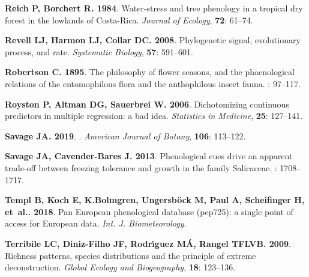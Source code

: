 \documentclass[11pt]{article}
\begin{document}
\begin{thebibliography}{39}
{  
  {\bf Reich P, Borchert R}{\bf . {1984}}.
  \newblock Water-stress and tree phenology in a tropical dry forest in the
  lowlands of Costa-Rica.
  \newblock \emph{{Journal of Ecology}}, {\bf {72}}: {61--74}.
  
  {\bf Revell LJ, Harmon LJ, Collar DC}{\bf . 2008}.
  \newblock Phylogenetic signal, evolutionary process, and rate.
  \newblock \emph{Systematic Biology}, {\bf 57}: 591--601.
  
  {\bf Robertson C}{\bf . 1895}.
  \newblock The philosophy of flower seasons, and the phaenological relations of
  the entomophilous flora and the anthophilous insect fauna.
  : 97--117.
  
  {\bf Royston P, Altman DG, Sauerbrei W}{\bf . 2006}.
  \newblock Dichotomizing continuous predictors in multiple regression: a bad
  idea.
  \newblock \emph{Statistics in Medicine}, {\bf 25}: 127--141.
  
  {\bf Savage JA}{\bf . {2019}}.
  .
  \newblock \emph{{American Journal of Botany}}, {\bf {106}}: {113--122}.
  
  {\bf Savage JA, Cavender-Bares J}{\bf . 2013}.
  \newblock Phenological cues drive an apparent trade-off between freezing
  tolerance and growth in the family Salicaceae.
  : 1708--1717.
  
  {\bf Templ B, Koch E, K.Bolmgren, Ungersb{\"o}ck M, Paul A, Scheifinger H,
  et~al.}{\bf . 2018}.
  \newblock Pan European phenological database (pep725): a single point of access
  for European data.
  \newblock \emph{Int. J. Biometeorology}.
  
  {\bf Terribile LC, Diniz-Filho JF, Rodr{\'\i}guez M{\'A}, Rangel TFLVB}{\bf .
  2009}.
  \newblock Richness patterns, species distributions and the principle of extreme
  deconstruction.
  \newblock \emph{Global Ecology and Biogeography}, {\bf 18}: 123--136.
  
}
\end{thebibliography}
\end{document}

